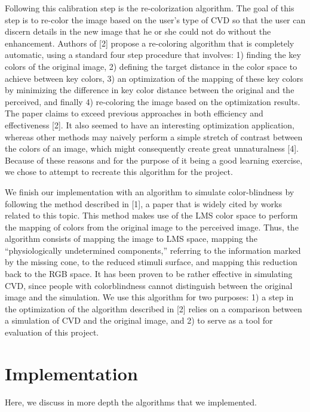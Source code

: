 \documentclass[10pt,twocolumn,letterpaper]{article}
\begin{document}
	Following this calibration step is the re-colorization algorithm. The goal of this step is to re-color the image based on the user’s type of CVD so that the user can discern details in the new image that he or she could not do without the enhancement. Authors of [2] propose a re-coloring algorithm that is completely automatic, using a standard four step procedure that involves: 1) finding the key colors of the original image, 2) defining the target distance in the color space to achieve between key colors, 3) an optimization of the mapping of these key colors by minimizing the difference in key color distance between the original and the perceived, and finally 4) re-coloring the image based on the optimization results. The paper claims to exceed previous approaches in both efficiency and effectiveness [2]. It also seemed to have an interesting optimization application, whereas other methods may naively perform a simple stretch of contrast between the colors of an image, which might consequently create great unnaturalness [4]. Because of these reasons and for the purpose of it being a good learning exercise, we chose to attempt to recreate this algorithm for the project. 

	We finish our implementation with an algorithm to simulate color-blindness by following the method described in [1], a paper that is widely cited by works related to this topic. This method makes use of the LMS color space to perform the mapping of colors from the original image to the perceived image. Thus, the algorithm consists of mapping the image to LMS space, mapping the “physiologically undetermined components,” referring to the information marked by the missing cone, to the reduced stimuli surface, and mapping this reduction back to the RGB space. It has been proven to be rather effective in simulating CVD, since people with colorblindness cannot distinguish between the original image and the simulation. We use this algorithm for two purposes: 1) a step in the optimization of the algorithm described in [2] relies on a comparison between a simulation of CVD and the original image, and 2) to serve as a tool for evaluation of this project. 

\section{Implementation}

Here, we discuss in more depth the algorithms that we implemented.
\end{document}
